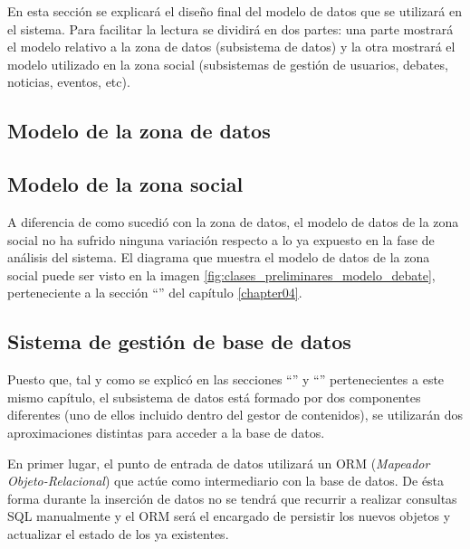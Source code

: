 En esta sección se explicará el diseño final del modelo de datos que se utilizará en el sistema.  Para facilitar la lectura se dividirá en dos partes: una parte mostrará el modelo relativo a la zona de datos (subsistema de datos) y la otra mostrará el modelo utilizado en la zona social (subsistemas de gestión de usuarios, debates, noticias, eventos, etc).


\subsection{Modelo de la zona de datos}
\label{modelo_datos_zona_datos}



\subsection{Modelo de la zona social}
\label{modelo_datos_zona_social}
A diferencia de como sucedió con la zona de datos, el modelo de datos de la zona social no ha sufrido ninguna variación respecto a lo ya expuesto en la fase de análisis del sistema.  El diagrama que muestra el modelo de datos de la zona social puede ser visto en la imagen \ref{fig:clases_preliminares_modelo_debate}, perteneciente a la sección ``'' del capítulo \ref{chapter04}.


\subsection{Sistema de gestión de base de datos}
Puesto que, tal y como se explicó en las secciones ``'' y ``'' pertenecientes a este mismo capítulo, el subsistema de datos está formado por dos componentes diferentes (uno de ellos incluido dentro del gestor de contenidos), se utilizarán dos aproximaciones distintas para acceder a la base de datos.

En primer lugar, el punto de entrada de datos utilizará un ORM (\textit{Mapeador Objeto-Relacional}) que actúe como intermediario con la base de datos.  De ésta forma  durante la inserción de datos no se tendrá que recurrir a realizar consultas SQL manualmente y el ORM será el encargado de persistir los nuevos objetos y actualizar el estado de los ya existentes.

